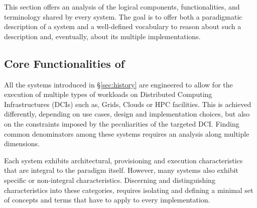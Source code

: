 \documentclass{sig-alternate}
\begin{document}
This section offers an analysis of the logical components,
functionalities, and terminology shared by every \pilotjob system. The
goal is to offer both a paradigmatic description of a \pilotjob system
and a well-defined vocabulary to reason about such a description and,
eventually, about its multiple implementations.





\subsection{Core Functionalities of \pilotjobs}
\label{subsec:vocab_core_functionalities}

All the \pilotjob systems introduced in \S\ref{sec:history} are
engineered to allow for the execution of multiple types of workloads on
Distributed Computing Infrastructures (DCIs) such as, Grids, Clouds or
HPC facilities. This is achieved differently, depending on use cases,
design and implementation choices, but also on the constraints imposed
by the peculiarities of the targeted DCI. Finding common denominators
among these systems requires an analysis along multiple dimensions.


Each \pilotjob system exhibits architectural, provisioning and execution
characteristics that are integral to the \pilotjob paradigm itself.
However, many \pilotjob systems also exhibit specific or non-integral
characteristics. Discerning and distinguishing characteristics into
these categories, requires isolating and defining a minimal set of
concepts and terms that have to apply to every \pilotjob implementation.
\end{document}
